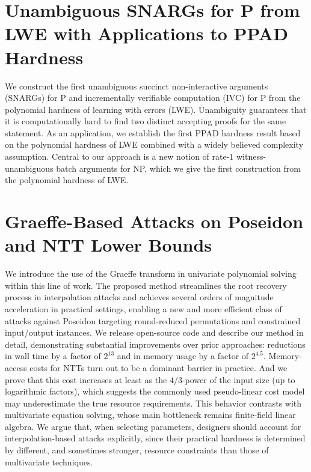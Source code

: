 \documentclass[11pt,oneside]{book}
\theoremstyle{definition}
\theoremstyle{remark}
\theoremstyle{plain}
\begin{document}
\section{\cite{cryptoeprint:2025/1913} Unambiguous SNARGs for P from LWE with Applications to PPAD Hardness
}
We construct the first unambiguous succinct non-interactive arguments (SNARGs) for P and incrementally verifiable computation (IVC) for P from the polynomial hardness of learning with errors (LWE). Unambiguity guarantees that it is computationally hard to find two distinct accepting proofs for the same statement. As an application, we establish the first PPAD hardness result based on the polynomial hardness of LWE combined with a widely believed complexity assumption. Central to our approach is a new notion of rate-1 witness-unambiguous batch arguments for NP, which we give the first construction from the polynomial hardness of LWE.

\section{\cite{cryptoeprint:2025/1916} Graeffe-Based Attacks on Poseidon and NTT Lower Bounds}
We introduce the use of the Graeffe transform in univariate polynomial solving within this line of work. The proposed method streamlines the root recovery process in interpolation attacks and achieves several orders of magnitude acceleration in practical settings, enabling a new and more efficient class of attacks against Poseidon targeting round-reduced permutations and constrained input/output instances. We release open-source code and describe our method in detail, demonstrating substantial improvements over prior approaches: reductions in wall time by a factor of $2^{13}$ and in memory usage by a factor of $2^{4.5}$. Memory-access costs for NTTs turn out to be a dominant barrier in practice. And we prove that this cost increases at least as the $4/3$-power of the input size (up to logarithmic factors), which suggests the commonly used pseudo-linear cost model may underestimate the true resource requirements. This behavior contrasts with multivariate equation solving, whose main bottleneck remains finite-field linear algebra. We argue that, when selecting parameters, designers should account for interpolation-based attacks explicitly, since their practical hardness is determined by different, and sometimes stronger, resource constraints than those of multivariate techniques.
%
%
\printbibliography
\end{document}

